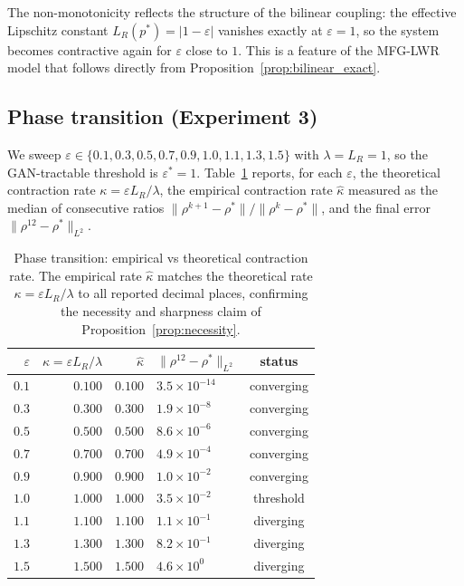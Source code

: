 The non-monotonicity reflects the structure of the bilinear coupling:
the effective Lipschitz constant $L_R(p^*) = |1-\varepsilon|$ vanishes
exactly at $\varepsilon = 1$, so the system becomes contractive again
for $\varepsilon$ close to $1$.  This is a feature of the MFG-LWR model
that follows directly from Proposition~\ref{prop:bilinear_exact}.

\subsection{Phase transition (Experiment 3)}

We sweep $\varepsilon \in \{0.1, 0.3, 0.5, 0.7, 0.9, 1.0, 1.1, 1.3, 1.5\}$
with $\lambda = L_R = 1$, so the GAN-tractable threshold is $\varepsilon^* = 1$.
Table~\ref{tab:phase_transition} reports, for each $\varepsilon$,
the theoretical contraction rate $\kappa = \varepsilon L_R/\lambda$,
the empirical contraction rate $\hat\kappa$ measured as the median of
consecutive ratios $\|\rho^{k+1}-\rho^*\|/\|\rho^k-\rho^*\|$,
and the final error $\|\rho^{12}-\rho^*\|_{L^2}$.

\begin{table}[h]
\centering
\begin{tabular}{rrrlc}
\toprule
$\varepsilon$ & $\kappa = \varepsilon L_R/\lambda$ & $\hat\kappa$
              & $\|\rho^{12}-\rho^*\|_{L^2}$ & status \\
\midrule
$0.1$ & $0.100$ & $0.100$ & $3.5\times 10^{-14}$ & converging \\
$0.3$ & $0.300$ & $0.300$ & $1.9\times 10^{-8}$  & converging \\
$0.5$ & $0.500$ & $0.500$ & $8.6\times 10^{-6}$  & converging \\
$0.7$ & $0.700$ & $0.700$ & $4.9\times 10^{-4}$  & converging \\
$0.9$ & $0.900$ & $0.900$ & $1.0\times 10^{-2}$  & converging \\
$1.0$ & $1.000$ & $1.000$ & $3.5\times 10^{-2}$  & threshold  \\
$1.1$ & $1.100$ & $1.100$ & $1.1\times 10^{-1}$  & diverging  \\
$1.3$ & $1.300$ & $1.300$ & $8.2\times 10^{-1}$  & diverging  \\
$1.5$ & $1.500$ & $1.500$ & $4.6\times 10^{0}$   & diverging  \\
\bottomrule
\end{tabular}
\caption{Phase transition: empirical vs theoretical contraction rate.
The empirical rate $\hat\kappa$ matches the theoretical rate
$\kappa = \varepsilon L_R/\lambda$ to all reported decimal places,
confirming the necessity and sharpness claim of
Proposition~\ref{prop:necessity}.}
\label{tab:phase_transition}
\end{table}

